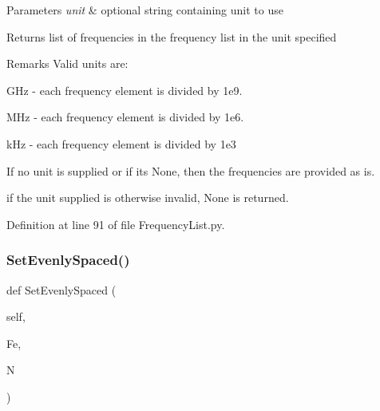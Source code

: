 \begin{DoxyParams}{Parameters}
{\em unit} & optional string containing unit to use \\
\hline
\end{DoxyParams}
\begin{DoxyReturn}{Returns}
list of frequencies in the frequency list in the unit specified 
\end{DoxyReturn}
\begin{DoxyRemark}{Remarks}
Valid units are\+:
\begin{DoxyItemize}
\item G\+Hz -\/ each frequency element is divided by 1e9.
\item M\+Hz -\/ each frequency element is divided by 1e6.
\item k\+Hz -\/ each frequency element is divided by 1e3
\end{DoxyItemize}
\end{DoxyRemark}
If no unit is supplied or if it\textquotesingle{}s None, then the frequencies are provided as is.

if the unit supplied is otherwise invalid, None is returned. 

Definition at line 91 of file Frequency\+List.\+py.

\mbox{\label{classSignalIntegrity_1_1FrequencyDomain_1_1FrequencyList_1_1FrequencyList_a910c951aef6578c9e467ddef68c94539}} 
\subsubsection{\texorpdfstring{Set\+Evenly\+Spaced()}{SetEvenlySpaced()}}
{\footnotesize\ttfamily def Set\+Evenly\+Spaced (\begin{DoxyParamCaption}\item[{}]{self,  }\item[{}]{Fe,  }\item[{}]{N }\end{DoxyParamCaption})}



